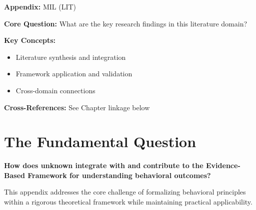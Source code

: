 
\begin{tcolorbox}[colback=blue!5!white, colframe=blue!75!black,
    title=Quick Reference: Appendix MIL]
\textbf{Appendix:} MIL (LIT)

\textbf{Core Question:} What are the key research findings in this literature domain?

\textbf{Key Concepts:}
\begin{itemize}[nosep]
\item Literature synthesis and integration
\item Framework application and validation
\item Cross-domain connections
\end{itemize}

\textbf{Cross-References:} See Chapter linkage below
\end{tcolorbox}


\begin{abstract}
This appendix provides a systematic review and integration of key research findings
in the LIT domain. It synthesizes literature relevant to the Evidence-Based
Framework (EBF) and identifies connections to the 10C CORE architecture.
\end{abstract}

\section{The Fundamental Question}
\label{sec:mil-fundamental}

\begin{tcolorbox}[
    colback=red!5!white,
    colframe=red!75!black,
    title={\textbf{Fundamental Question}}
]
\textbf{How does unknown integrate with and contribute to the
Evidence-Based Framework for understanding behavioral outcomes?}

This appendix addresses the core challenge of formalizing behavioral principles
within a rigorous theoretical framework while maintaining practical applicability.
\end{tcolorbox}


